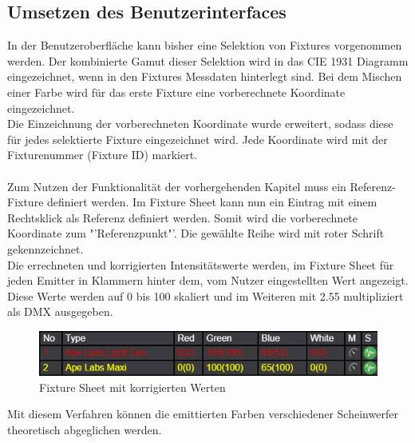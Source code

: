 \documentclass[11pt]{scrartcl}
\begin{document}
\subsection{Umsetzen des Benutzerinterfaces}
In der Benutzeroberfläche kann bisher eine Selektion von Fixtures vorgenommen werden. Der kombinierte Gamut dieser Selektion wird in das CIE 1931 Diagramm
eingezeichnet, wenn in den Fixtures Messdaten hinterlegt sind. Bei dem Mischen einer Farbe wird für das erste Fixture eine vorberechnete Koordinate
eingezeichnet.\\
Die Einzeichnung der vorberechneten Koordinate wurde erweitert, sodass diese für jedes selektierte Fixture eingezeichnet wird. Jede Koordinate wird mit
der Fixturenummer (Fixture ID) markiert.\\
\\
Zum Nutzen der Funktionalität der vorhergehenden Kapitel muss ein Referenz-Fixture definiert werden. Im Fixture Sheet kann nun ein Eintrag mit
einem Rechtsklick als Referenz definiert werden. Somit wird die vorberechnete Koordinate zum "'Referenzpunkt"'. Die gewählte Reihe wird mit roter
Schrift gekennzeichnet.\\
Die errechneten und korrigierten Intensitätswerte werden, im Fixture Sheet für jeden Emitter in Klammern hinter dem, vom Nutzer eingestellten Wert angezeigt.
Diese Werte werden auf 0 bis 100 skaliert und im Weiteren mit 2.55 multipliziert als DMX ausgegeben.
\begin{figure}[H]
    \begin{center}
        \includegraphics[width=.8\textwidth]{images/app_fixture_sheet_with_reference.png} %
    \end{center}
    \caption{Fixture Sheet mit korrigierten Werten}
\end{figure}
\noindent
Mit diesem Verfahren können die emittierten Farben verschiedener Scheinwerfer theoretisch abgeglichen werden.
\clearpage

\end{document}
